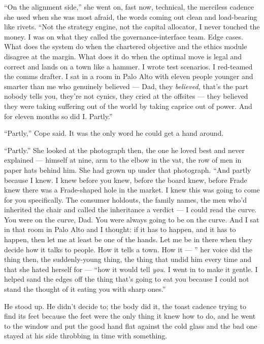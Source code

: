 \documentclass[11pt,openany]{book}
\newcommand{\scenebreak}{\par\vspace{0.5\baselineskip}\begin{center}\textasteriskcentered\quad\textasteriskcentered\quad\textasteriskcentered\end{center}\vspace{0.5\baselineskip}\par}
\begin{document}
``On the alignment side,'' she went on, fast now, technical, the merciless cadence she used when she was most afraid, the words coming out clean and load-bearing like rivets. ``Not the strategy engine, not the capital allocator, I never touched the money. I was on what they called the governance-interface team. Edge cases. What does the system do when the chartered objective and the ethics module disagree at the margin. What does it do when the optimal move is legal and correct and lands on a town like a hammer. I wrote test scenarios. I red-teamed the comms drafter. I sat in a room in Palo Alto with eleven people younger and smarter than me who genuinely believed --- Dad, they \textit{believed,} that's the part nobody tells you, they're not cynics, they cried at the offsites --- they believed they were taking suffering out of the world by taking caprice out of power. And for eleven months so did I. Partly.''

``Partly,'' Cope said. It was the only word he could get a hand around.

``Partly.'' She looked at the photograph then, the one he loved best and never explained --- himself at nine, arm to the elbow in the vat, the row of men in paper hats behind him. She had grown up under that photograph. ``And partly because I knew. I knew before you knew, before the board knew, before Frade knew there was a Frade-shaped hole in the market. I knew this was going to come for you specifically. The consumer holdouts, the family names, the men who'd inherited the chair and called the inheritance a verdict --- I could read the curve. You were on the curve, Dad. You were always going to be on the curve. And I sat in that room in Palo Alto and I thought: if it has to happen, and it has to happen, then let me at least be one of the hands. Let me be in there when they decide how it talks to people. How it tells a town. How it --- '' her voice did the thing then, the suddenly-young thing, the thing that undid him every time and that she hated herself for --- ``how it would tell \textit{you.} I went in to make it gentle. I helped sand the edges off the thing that's going to eat you because I could not stand the thought of it eating you with sharp ones.''


\scenebreak


He stood up. He didn't decide to; the body did it, the toast cadence trying to find its feet because the feet were the only thing it knew how to do, and he went to the window and put the good hand flat against the cold glass and the bad one stayed at his side throbbing in time with something.
\end{document}
